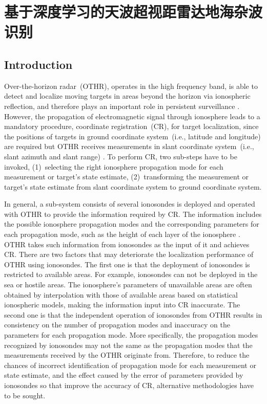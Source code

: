 \chapter{基于深度学习的天波超视距雷达地海杂波识别}
\section{Introduction}
%
Over-the-horizon radar~(OTHR), operates in the high frequency band, is able to detect and localize moving targets in areas beyond the horizon via ionospheric reflection, and therefore plays an important role in persistent surveillance \cite{headrick1974over, fabrizio2013high}. However, the propagation of electromagnetic signal through ionosphere leads to a mandatory procedure, coordinate registration~(CR), for target localization, since the positions of targets in ground coordinate system~(i.e., latitude and longitude) are required but OTHR receives measurements in slant coordinate system~(i.e., slant azimuth and slant range) \cite{krolik1997maximum}. To perform CR, two sub-steps have to be invoked, (1)~selecting the right ionosphere propagation mode for each measurement or target's state estimate, (2)~transforming the measurement or target's state estimate from slant coordinate system to ground coordinate system.

In general, a sub-system consists of several ionosondes is deployed and operated with OTHR to provide the information required by CR. The information includes the possible ionosphere propagation modes and the corresponding parameters for each propagation mode, such as the height of each layer of the ionosphere \cite{wheadon1994ionospheric}. OTHR takes such information from ionosondes as the input of it and achieves CR. There are two factors that may deteriorate the localization performance of OTHR using ionosondes. The first one is that the deployment of ionosondes is restricted to available areas. For example, ionosondes can not be deployed in the sea or hostile areas. The ionosphere's parameters of unavailable areas are often obtained by interpolation with those of available areas based on statistical ionospheric models, making the information input into CR inaccurate. The second one is that the independent operation of ionosondes from OTHR results in consistency on the number of propagation modes and inaccuracy on the parameters for each propagation mode. More specifically, the propagation modes recognized by ionosondes may not the same as the propagation modes that the measurements received by the OTHR originate from. Therefore, to reduce the chances of incorrect identification of propagation mode for each measurement or state estimate, and the effect caused by the error of parameters provided by ionosondes so that improve the accuracy of CR, alternative methodologies have to be sought.

